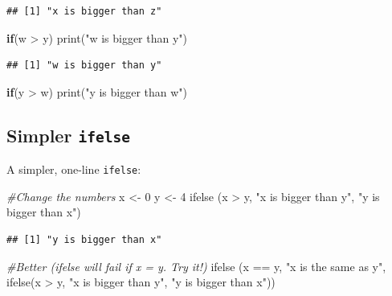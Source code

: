 \documentclass[
]{book}
\newenvironment{Shaded}{\begin{snugshade}}{\end{snugshade}}
\newcommand{\CommentTok}[1]{\textcolor[rgb]{0.56,0.35,0.01}{\textit{#1}}}
\newcommand{\ControlFlowTok}[1]{\textcolor[rgb]{0.13,0.29,0.53}{\textbf{#1}}}
\newcommand{\DecValTok}[1]{\textcolor[rgb]{0.00,0.00,0.81}{#1}}
\newcommand{\FunctionTok}[1]{\textcolor[rgb]{0.00,0.00,0.00}{#1}}
\newcommand{\NormalTok}[1]{#1}
\newcommand{\OtherTok}[1]{\textcolor[rgb]{0.56,0.35,0.01}{#1}}
\newcommand{\SpecialCharTok}[1]{\textcolor[rgb]{0.00,0.00,0.00}{#1}}
\newcommand{\StringTok}[1]{\textcolor[rgb]{0.31,0.60,0.02}{#1}}
\begin{document}
\begin{verbatim}
## [1] "x is bigger than z"
\end{verbatim}

\begin{Shaded}
\begin{Highlighting}[]
\ControlFlowTok{if}\NormalTok{(w }\SpecialCharTok{\textgreater{}}\NormalTok{ y) }\FunctionTok{print}\NormalTok{(}\StringTok{"w is bigger than y"}\NormalTok{)}
\end{Highlighting}
\end{Shaded}

\begin{verbatim}
## [1] "w is bigger than y"
\end{verbatim}

\begin{Shaded}
\begin{Highlighting}[]
\ControlFlowTok{if}\NormalTok{(y }\SpecialCharTok{\textgreater{}}\NormalTok{ w) }\FunctionTok{print}\NormalTok{(}\StringTok{"y is bigger than w"}\NormalTok{)}
\end{Highlighting}
\end{Shaded}

\hypertarget{simpler-ifelse}{%
\subsection{\texorpdfstring{Simpler \texttt{ifelse}}{Simpler ifelse}}\label{simpler-ifelse}}

A simpler, one-line \texttt{ifelse}:

\begin{Shaded}
\begin{Highlighting}[]
\CommentTok{\#Change the numbers}
\NormalTok{x }\OtherTok{\textless{}{-}} \DecValTok{0}
\NormalTok{y }\OtherTok{\textless{}{-}} \DecValTok{4}
\FunctionTok{ifelse}\NormalTok{ (x }\SpecialCharTok{\textgreater{}}\NormalTok{ y, }\StringTok{"x is bigger than y"}\NormalTok{, }\StringTok{"y is bigger than x"}\NormalTok{)}
\end{Highlighting}
\end{Shaded}

\begin{verbatim}
## [1] "y is bigger than x"
\end{verbatim}

\begin{Shaded}
\begin{Highlighting}[]
\CommentTok{\#Better (ifelse will fail if x = y.  Try it!)}
\FunctionTok{ifelse}\NormalTok{ (x }\SpecialCharTok{==}\NormalTok{ y, }\StringTok{"x is the same as y"}\NormalTok{,}
        \FunctionTok{ifelse}\NormalTok{(x }\SpecialCharTok{\textgreater{}}\NormalTok{ y, }\StringTok{"x is bigger than y"}\NormalTok{, }\StringTok{"y is bigger than x"}\NormalTok{))}
\end{Highlighting}
\end{Shaded}
\end{document}
